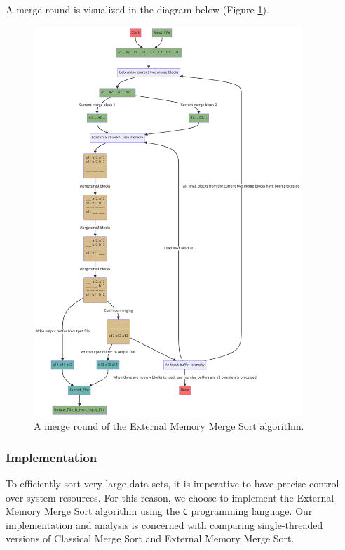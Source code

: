 \documentclass[twocolumn]{article}
\begin{document}
A merge round is visualized in the diagram below (Figure \ref{fig:merge_round_diagram.pdf}).
\begin{figure}
    \centering
    \includegraphics[width=0.9\textwidth]{./res/merge_round_diagram.pdf}
    \caption{A merge round of the External Memory Merge Sort algorithm.}
    \label{fig:merge_round_diagram.pdf}
\end{figure}

\subsubsection*{Implementation}
To efficiently sort very large data sets, it is imperative to have precise control over system resources.
For this reason, we choose to implement the External Memory Merge Sort algorithm using the \texttt{C} programming language.
Our implementation and analysis is concerned with comparing single-threaded versions of Classical Merge Sort and External Memory Merge Sort.
\end{document}
